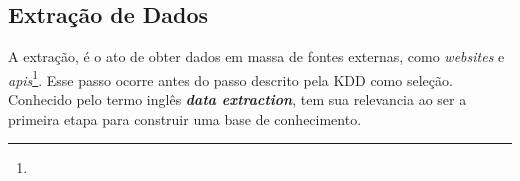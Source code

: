 \subsection{Extração de Dados}
A extração, é o ato de obter dados em massa de fontes externas, como \textit{websites} e \textit{apis}\footnote{}. Esse passo ocorre antes do passo descrito pela KDD como seleção. Conhecido pelo termo inglês \textit{\textbf{data extraction}}, tem sua relevancia ao ser a primeira etapa para construir uma base de conhecimento.

